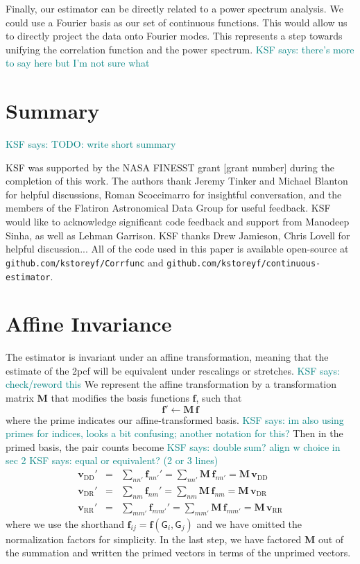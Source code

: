 \documentclass[modern]{aastex62}
\newcommand{\cf}{2pcf\xspace} %
\newcommand{\bld}[1]{\bm{#1}} %
\newcommand{\vv}[1]{\bld{v}_\mathrm{#1}}
\newcommand{\ff}{\bld{f}}
\newcommand{\GG}[1]{\mathsf{G}_{#1}}
\newcommand{\KSF}[1]{\textcolor{teal}{KSF says: #1}}
\begin{document}
Finally, our estimator can be directly related to a power spectrum analysis.
We could use a Fourier basis as our set of continuous functions.
This would allow us to directly project the data onto Fourier modes.
This represents a step towards unifying the correlation function and the power spectrum. \KSF{there's more to say here but I'm not sure what}


\section{Summary}

\KSF{TODO: write short summary}

\acknowledgements
KSF was supported by the NASA FINESST grant [grant number] during the completion of this work.
The authors thank Jeremy Tinker and Michael Blanton for helpful discussions, Roman Scoccimarro for insightful conversation, and the members of the Flatiron Astronomical Data Group for useful feedback.
KSF would like to acknowledge significant code feedback and support from Manodeep Sinha, as well as Lehman Garrison.
KSF thanks Drew Jamieson, Chris Lovell for helpful discussion...
All of the code used in this paper is available open-source at \texttt{github.com/kstoreyf/Corrfunc} and \texttt{github.com/kstoreyf/continuous-estimator}. 

\appendix
\section{Affine Invariance}\label{sec:affine}

The estimator is invariant under an affine transformation, meaning that the estimate of the \cf will be equivalent under rescalings or stretches. \KSF{check/reword this}
We represent the affine transformation by a transformation matrix $\bld{M}$ that modifies the basis functions $\ff$, such that 
\begin{equation}
\ff' \leftarrow \bld{M}\,\ff
\end{equation}
where the prime indicates our affine-transformed basis.
\KSF{im also using primes for indices, looks a bit confusing; another notation for this?}
Then in the primed basis, the pair counts become
\KSF{double sum? align w choice in sec 2}
\KSF{equal or equivalent? (2 or 3 lines)}
\begin{eqnarray}\displaystyle
\vv{DD}' &=& \sum_{n n'} \ff_{n n'}' = \sum_{n n'} \bld{M}\,\ff_{n n'} = \bld{M}\,\vv{DD}
\\
\vv{DR}' &=& \sum_{n m} \ff_{n m}' = \sum_{n m} \bld{M}\,\ff_{n m} = \bld{M}\,\vv{DR}
\\
\vv{RR}' &=& \sum_{m m'} \ff_{m m'}' = \sum_{m m'} \bld{M}\,\ff_{m m'} = \bld{M}\,\vv{RR}
\end{eqnarray}
where we use the shorthand $\ff_{i j} = \ff(\GG{i}, \GG{j})$ and we have omitted the normalization factors for simplicity.
In the last step, we have factored $\bld{M}$ out of the summation and written the primed vectors in terms of the unprimed vectors. 
\end{document}
